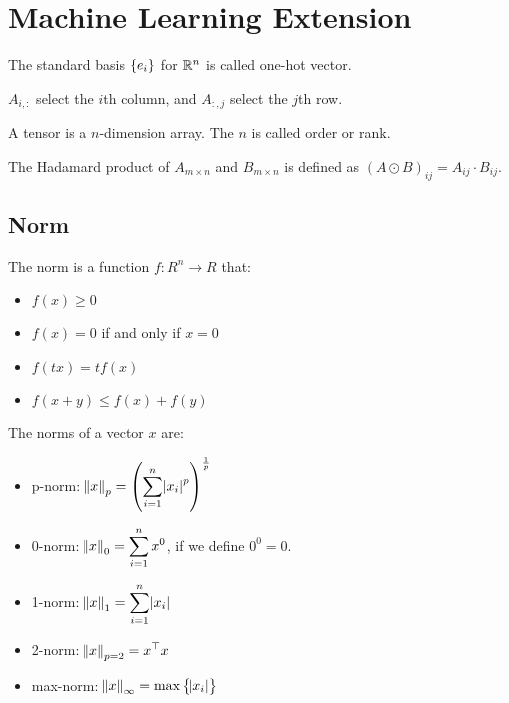 \chapter{Machine Learning Extension}


The standard basis $\set{e_i}$ for $\mathbb{R}^n$ is called one-hot vector.

$A_{i,:}$ select the $i$th column, and $A_{:,j}$ select the $j$th row.

A tensor is a $n$-dimension array. The $n$ is called order or rank.


\begin{definition}
    The Hadamard product of $A_{m \times n}$ and $B_{m\times n}$ is defined as $(A \odot B)_{ij} = A_{ij} \cdot B_{ij}$.
\end{definition}

\section{Norm}

\begin{definition}[Norm]
    The norm is a function $f : R^n \rightarrow R$ that:
    \begin{itemize}
        \item $f(x) \geq 0$
        \item $f(x) = 0$ if and only if $x = 0$
        \item $f(tx) = t f(x)$
        \item $f(x+y) \leq f(x) + f(y)$
    \end{itemize}
\end{definition}

\begin{definition}
    The norms of a vector $x$ are:
\begin{itemize}
    \item p-norm: $\displaystyle \norm{x}_p = \left(\sum_{i=1}^n \abs{x_i}^p \right)^{\frac{1}{p}}$
    \item 0-norm: $\displaystyle \norm{x}_0 = \sum_{i=1}^n x^0$, if we define $0^0 = 0$.
    \item 1-norm: $\displaystyle \norm{x}_1 = \sum_{i=1}^n \abs{x_i}$
    \item 2-norm: $\displaystyle \norm{x}_{p=2} = {x}^\top x$
    \item max-norm: $\norm{x}_\infty = \max \set{\abs{x_i}}$
\end{itemize}
\end{definition}

